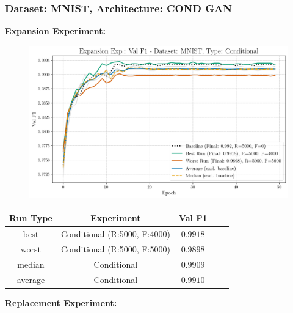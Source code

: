 \subsubsection{Dataset: MNIST, Architecture: COND GAN}
\noindent\textbf{Expansion Experiment:}
\begin{figure}[htbp]
	\centering
	\includegraphics[width=.85\textwidth]{abb/strat_classifier_performance/MNIST_STRATIFIED_CLASSIFIERS_COND_GAN/expansion_experiments/val_f1_score_['COND']_MNIST_all.png}
	\label{fig:app_strat_class_performance_expansion_exp._val_f1_score_cGAN}
\end{figure}
\begin{table}[H]
	\centering
	\vspace{-1em}
	\begin{tabular}{|c|c|c|c|c|}
		\hline
		Run Type & Experiment & Val F1 \\ \hline
		best & Conditional (R:5000, F:4000) & $0.9918$\\ \hline
		worst & Conditional (R:5000, F:5000) & $0.9898$\\ \hline
		median & Conditional & $0.9909$\\ \hline
		average & Conditional & $0.9910$
		\\ \hline
	\end{tabular}
\end{table}
\noindent\textbf{Replacement Experiment:}
